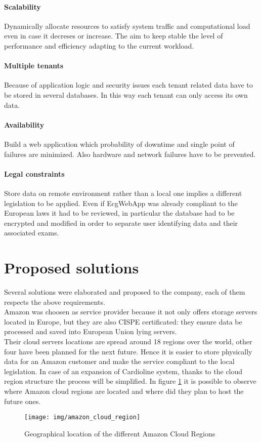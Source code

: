 \paragraph{Scalability}
Dynamically allocate resources to satisfy system traffic and computational load even in case it decreses or increase. The aim to keep stable the level of performance and efficiency adapting to the current workload.\\
\paragraph{Multiple tenants}
Because of application logic and security issues each tenant related data have to be stored in several databases. In this way each tenant can only access its own data.
\paragraph{Availability}
Build a web application which probability of downtime and single point of failures are minimized. Also hardware and network failures have to be prevented.

\paragraph{Legal constraints}
Store data on remote environment rather than a local one implies a different legislation to be applied. Even if EcgWebApp was already compliant to the European laws it had to be reviewed, in particular the database had to be encrypted and modified in order to separate user identifying data and their associated exams.



\section{Proposed solutions}
\label{section:proposed_solutions}
Several solutions were elaborated and proposed to the company, each of them respects the above requirements.\\
Amazon was choosen as service provider because it not only offers storage servers located in Europe, but they are also CISPE certificated: they ensure data be processed and saved into European Union lying servers.\\
Their cloud servers locations are spread around 18 regions over the world, other four have been planned for the next future. Hence it is easier to store physically data for an Amazon customer and make the service compliant to the local legislation. In case of an expansion of Cardioline system, thanks to the cloud region structure the process will be simplified. In figure \ref{fig:amazon_cloud_region} it is possible to observe where Amazon cloud regions are located and where did they plan to host the future ones.
\begin{figure}[h]
    \texttt{[image: img/amazon\_cloud\_region]}
    \caption{Geographical location of the different Amazon Cloud Regions}
    \label{fig:amazon_cloud_region}
\end{figure}

